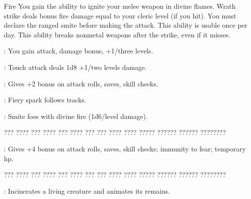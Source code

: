 {Fire}
{You gain the ability to ignite your melee weapon in divine flames. Wrath strike deals bonus fire damage equal to your cleric level (if you hit). You must declare the ranged smite before making the attack. This ability is usable once per day. This ability breaks nonmetal weapons after the strike, even if it misses.}
{
	\item {}: You gain attack, damage bonus, +1/three levels.
	\item {}: Touch attack deals 1d8 +1/two levels damage.
	\item {}: Gives +2 bonus on attack rolls, saves, skill checks.
	\item {}: Fiery spark follows tracks.
	\item {}: Smite foes with divine fire (1d6/level damage).
	\item ??? ???? ??? ???? ??? ???? ??? ??? ???? ???? ????? ?????? ?????? ????????
	\item {}: Gives +4 bonus on attack rolls, saves, skill checks; immunity to fear; temporary hp.
	\item ??? ???? ??? ???? ??? ???? ??? ??? ???? ???? ????? ?????? ?????? ????????
	\item {}: Incinerates a living creature and animates its remains.
}